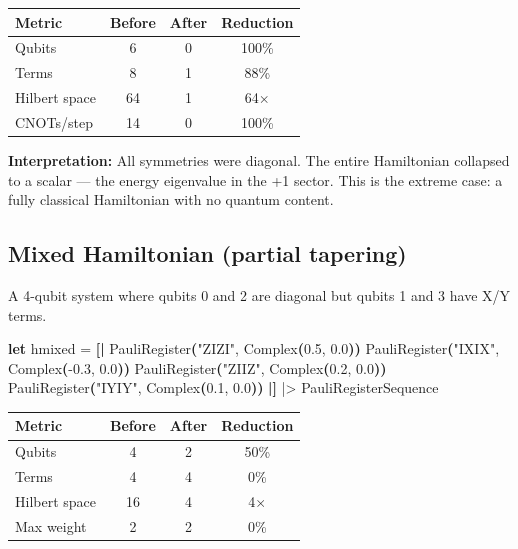 \documentclass[
  11pt,
  oneside]{book}
\newenvironment{Shaded}{\begin{snugshade}}{\end{snugshade}}
\newcommand{\FloatTok}[1]{\textcolor[rgb]{0.00,0.00,0.81}{#1}}
\newcommand{\KeywordTok}[1]{\textcolor[rgb]{0.13,0.29,0.53}{\textbf{#1}}}
\newcommand{\NormalTok}[1]{#1}
\newcommand{\OperatorTok}[1]{\textcolor[rgb]{0.81,0.36,0.00}{\textbf{#1}}}
\newcommand{\StringTok}[1]{\textcolor[rgb]{0.31,0.60,0.02}{#1}}
\begin{document}
\begin{longtable}[]{@{}lccc@{}}
\toprule\noalign{}
Metric & Before & After & Reduction \\
\midrule\noalign{}
\endhead
\bottomrule\noalign{}
\endlastfoot
Qubits & 6 & 0 & 100\% \\
Terms & 8 & 1 & 88\% \\
Hilbert space & 64 & 1 & 64$\times$ \\
CNOTs/step & 14 & 0 & 100\% \\
\end{longtable}

\textbf{Interpretation:} All symmetries were diagonal. The entire
Hamiltonian collapsed to a scalar --- the energy eigenvalue in the +1
sector. This is the extreme case: a fully classical Hamiltonian with no
quantum content.

\subsection{Mixed Hamiltonian (partial
tapering)}\label{mixed-hamiltonian-partial-tapering}

A 4-qubit system where qubits 0 and 2 are diagonal but qubits 1 and 3
have X/Y terms.

\begin{Shaded}
\begin{Highlighting}[]
\KeywordTok{let}\NormalTok{ hmixed =}
    \OperatorTok{[|}\NormalTok{ PauliRegister}\OperatorTok{(}\StringTok{"ZIZI"}\NormalTok{, Complex}\OperatorTok{(}\FloatTok{0.5}\NormalTok{, }\FloatTok{0.0}\OperatorTok{))}
\NormalTok{       PauliRegister}\OperatorTok{(}\StringTok{"IXIX"}\NormalTok{, Complex}\OperatorTok{(}\FloatTok{{-}0.3}\NormalTok{, }\FloatTok{0.0}\OperatorTok{))}
\NormalTok{       PauliRegister}\OperatorTok{(}\StringTok{"ZIIZ"}\NormalTok{, Complex}\OperatorTok{(}\FloatTok{0.2}\NormalTok{, }\FloatTok{0.0}\OperatorTok{))}
\NormalTok{       PauliRegister}\OperatorTok{(}\StringTok{"IYIY"}\NormalTok{, Complex}\OperatorTok{(}\FloatTok{0.1}\NormalTok{, }\FloatTok{0.0}\OperatorTok{))} \OperatorTok{|]}
\NormalTok{    |\textgreater{} PauliRegisterSequence}
\end{Highlighting}
\end{Shaded}

\begin{longtable}[]{@{}lccc@{}}
\toprule\noalign{}
Metric & Before & After & Reduction \\
\midrule\noalign{}
\endhead
\bottomrule\noalign{}
\endlastfoot
Qubits & 4 & 2 & 50\% \\
Terms & 4 & 4 & 0\% \\
Hilbert space & 16 & 4 & 4$\times$ \\
Max weight & 2 & 2 & 0\% \\
\end{longtable}
\end{document}
